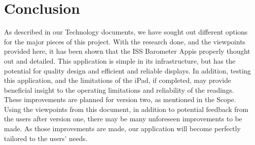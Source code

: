 \documentclass[onecolumn, draftclsnofoot,10pt, compsoc]{IEEEtran}
\def \CapstoneProjectName{ISS Barometer App}
\begin{document}
\section{Conclusion}
As described in our Technology documents, we have sought out different options for the major pieces of this project.
With the research done, and the viewpoints provided here, it has been shown that the \CapstoneProjectName is properly thought out and detailed.
This application is simple in its infrastructure, but has the potential for quality design and efficient and reliable displays.
In addition, testing this application, and the limitations of the iPad, if completed, may provide beneficial insight to the operating limitations and reliability of the readings.
These improvements are planned for version two, as mentioned in the Scope.
Using the viewpoints from this document, in addition to potential feedback from the users after version one, there may be many unforeseen improvements to be made.
As those improvements are made, our application will become perfectly tailored to the users' needs.
\end{document}
